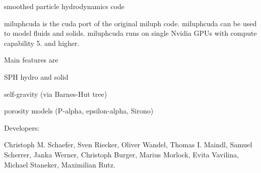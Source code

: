 \label{index_md_README}%
%
smoothed particle hydrodynamics code

miluphcuda is the cuda port of the original miluph code. miluphcuda can be used to model fluids and solids. miluphcuda runs on single Nvidia G\+P\+Us with compute capability 5. and higher.

Main features are


\begin{DoxyItemize}
\item S\+PH hydro and solid
\item self-\/gravity (via Barnes-\/\+Hut tree)
\item porosity models (P-\/alpha, epsilon-\/alpha, Sirono)
\end{DoxyItemize}

Developers\+:

Christoph M. Schaefer, Sven Riecker, Oliver Wandel, Thomas I. Maindl, Samuel Scherrer, Janka Werner, Christoph Burger, Marius Morlock, Evita Vavilina, Michael Staneker, Maximilian Rutz. 